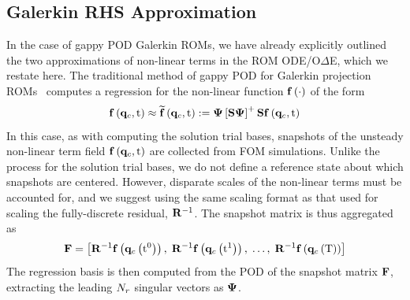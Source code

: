 \subsection{Galerkin RHS Approximation}
%
In the case of gappy POD Galerkin ROMs, we have already explicitly outlined the two approximations of non-linear terms in the ROM ODE/O$\Delta$E, which we restate here. The traditional method of gappy POD for Galerkin projection ROMs~\cite{Chaturantabut2010} computes a regression for the non-linear function $\mathbf{f} \left(\cdot\right)$ of the form
%
\begin{equation}
	\rhsFunc{\consVec, \timeVar} \approx \rhsApproxFunc{\consVec, \timeVar} \defEq \deimBasis \left[\sampMat \deimBasis \right]^+ \sampMat \rhsFunc{\consVec, \timeVar}
\end{equation}
%
In this case, as with computing the solution trial bases, snapshots of the unsteady non-linear term field $\mathbf{f} \left(\mathbf{q}_{c}, \text{t}\right)$ are collected from FOM simulations. Unlike the process for the solution trial bases, we do not define a reference state about which snapshots are centered. However, disparate scales of the non-linear terms must be accounted for, and we suggest using the same scaling format as that used for scaling the fully-discrete residual, $\resScaleInv$. The snapshot matrix is thus aggregated as
%
\begin{equation}
	\rhsDataMat = \left[ \resScaleInv \rhsFunc{\consFunc{\timeVar^0}}, \; \resScaleInv \rhsFunc{\consFunc{\timeVar^1}}, \; \hdots, \; \resScaleInv \rhsFunc{\consFunc{\finalTime}} \right]
\end{equation}
%
The regression basis is then computed from the POD of the snapshot matrix $\rhsDataMat$, extracting the leading $N_r$ singular vectors as $\deimBasis$.

